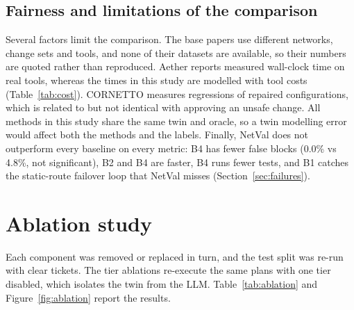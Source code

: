 \documentclass[pdflatex,iicol,sn-mathphys-num]{sn-jnl}%
\theoremstyle{thmstyletwo}%
\begin{document}
\subsection{Fairness and limitations of the comparison}\label{sec:fairness}

Several factors limit the comparison. The base papers use different networks, change sets and tools, and none of their datasets are available, so their numbers are quoted rather than reproduced. Aether reports measured wall-clock time on real tools, whereas the times in this study are modelled with tool costs (Table~\ref{tab:cost}). CORNETTO measures regressions of repaired configurations, which is related to but not identical with approving an unsafe change. All methods in this study share the same twin and oracle, so a twin modelling error would affect both the methods and the labels. Finally, NetVal does not outperform every baseline on every metric: B4 has fewer false blocks (0.0\% vs 4.8\%, not significant), B2 and B4 are faster, B4 runs fewer tests, and B1 catches the static-route failover loop that NetVal misses (Section~\ref{sec:failures}).

\section{Ablation study}\label{sec:ablation}

Each component was removed or replaced in turn, and the test split was re-run with clear tickets. The tier ablations re-execute the same plans with one tier disabled, which isolates the twin from the LLM. Table~\ref{tab:ablation} and Figure~\ref{fig:ablation} report the results.
\end{document}
